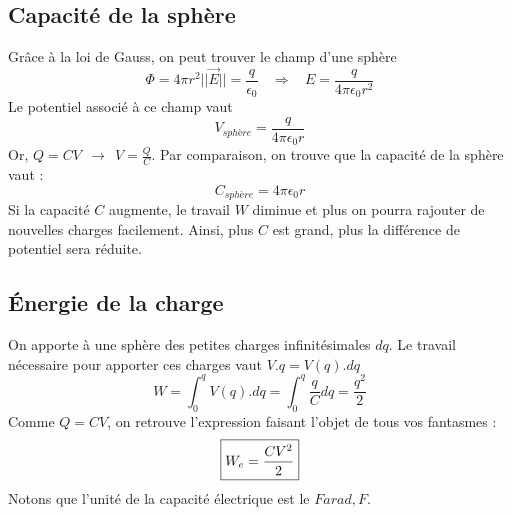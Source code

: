 \documentclass	[11pt, a4paper, openany]{book}
\begin{document}
\subsection{Capacité de la sphère}
Grâce à la loi de Gauss, on peut trouver le champ d'une sphère 
\begin{equation}
\Phi = 4\pi r^2 ||\vec{E}|| = \frac{q}{\epsilon_0}\ \ \ \ \Rightarrow\ \ \ \ E = \frac{q}{4\pi \epsilon_0 r^2}
\end{equation}
Le potentiel associé à ce champ vaut 
\begin{equation}
V_{sphère} = \frac{q}{4\pi \epsilon_0 r}
\end{equation}
Or, $Q = CV\ \ \rightarrow\ \ V = \frac{Q}{C}$. Par comparaison, on trouve que la capacité de la sphère vaut :
\begin{equation}
C_{sphère} = 4\pi \epsilon_0 r
\end{equation}
Si la capacité $C$ augmente, le travail $W$ diminue et plus on pourra rajouter de nouvelles charges facilement. Ainsi, plus $C$ est grand, plus la différence de potentiel sera réduite.

\subsection{Énergie de la charge}
On apporte à une sphère des petites charges infinitésimales $dq$. Le travail nécessaire pour apporter ces charges vaut $V.q = V(q).dq$
\begin{equation}
W = \int_0^q V(q).dq = \int_0^q \frac{q}{C}dq = \frac{q^2}{2} 
\end{equation}
Comme $Q = CV$, on retrouve l'expression faisant l'objet de tous vos fantasmes :
\begin{equation}
\fbox{$W_e = \dfrac{CV^2}{2}$}
\end{equation}
Notons que l'unité de la capacité électrique est le $Farad, F$.
\end{document}
